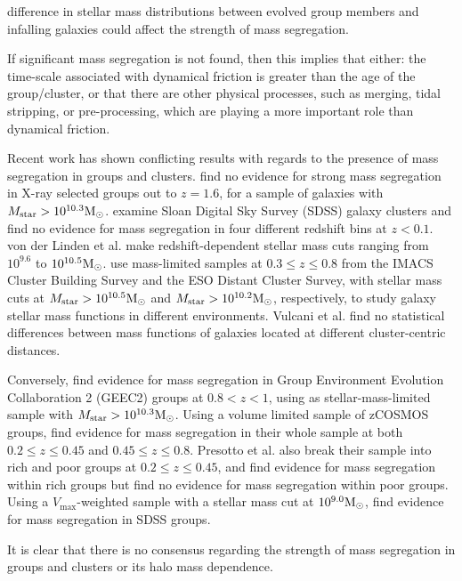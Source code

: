 difference in stellar mass distributions between evolved group members
and infalling galaxies could affect the strength of mass segregation.
\par
If significant mass segregation is not found, then this implies that
either: the time-scale associated with dynamical friction is greater
than the age of the group/cluster, or that there are other physical
processes, such as merging, tidal stripping, or pre-processing, which
are playing a more important role than dynamical friction.
\par
Recent work has shown conflicting results with regards to the presence
of mass segregation in groups and clusters.  \citet{ziparo2013} find
no evidence for strong mass segregation in X-ray selected groups out
to $z=1.6$, for a sample of galaxies with $M_\mathrm{star} >
10^{10.3}\mathrm{M_{\odot}}$.  \citet{vonderlinden2010} examine Sloan Digital Sky
Survey (SDSS) galaxy clusters and find no evidence for mass
segregation in four different redshift bins at $z < 0.1$.  von der
Linden et al. make redshift-dependent stellar mass cuts ranging from
$10^{9.6}$ to $10^{10.5}\mathrm{M_{\odot}}$.  \citet{vulcani2013} use mass-limited
samples at $0.3 \le z \le 0.8$ from the IMACS Cluster Building Survey
and the ESO Distant Cluster Survey, with stellar mass cuts at
$M_\mathrm{star} > 10^{10.5}\mathrm{M_{\odot}}$ and $M_\mathrm{star} >
10^{10.2}\mathrm{M_{\odot}}$, respectively, to study galaxy stellar mass functions
in different environments.  Vulcani et al. find no statistical
differences between mass functions of galaxies located at different
cluster-centric distances.
\par
Conversely, \citet{balogh2014} find evidence for mass segregation in
Group Environment Evolution Collaboration 2 (GEEC2) groups at $0.8 < z
< 1$, using as stellar-mass-limited sample with $M_\mathrm{star} >
10^{10.3}\mathrm{M_{\odot}}$.  Using a volume limited sample of zCOSMOS groups,
\citet{presotto2012} find evidence for mass segregation in their whole
sample at both $0.2 \le z \le 0.45$ and $0.45 \le z \le 0.8$.
Presotto et al. also break their sample into rich and poor groups at
$0.2 \le z \le 0.45$, and find evidence for mass segregation within
rich groups but find no evidence for mass segregation within poor
groups.  Using a $V_\mathrm{max}$-weighted sample with a stellar mass
cut at $10^{9.0}\mathrm{M_{\odot}}$, \citet{vandenbosch2008} find evidence for mass
segregation in SDSS groups.
\par
It is clear that there is no consensus regarding the strength of mass
segregation in groups and clusters or its halo mass dependence.
\par
